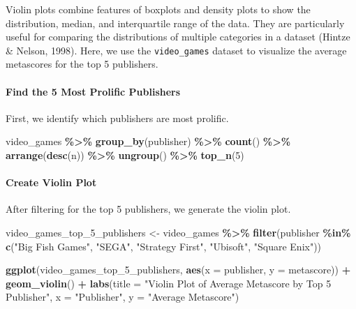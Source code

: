 \documentclass[
]{book}
\newenvironment{Shaded}{\begin{snugshade}}{\end{snugshade}}
\newcommand{\AttributeTok}[1]{\textcolor[rgb]{0.13,0.29,0.53}{#1}}
\newcommand{\DecValTok}[1]{\textcolor[rgb]{0.00,0.00,0.81}{#1}}
\newcommand{\FunctionTok}[1]{\textcolor[rgb]{0.13,0.29,0.53}{\textbf{#1}}}
\newcommand{\NormalTok}[1]{#1}
\newcommand{\OtherTok}[1]{\textcolor[rgb]{0.56,0.35,0.01}{#1}}
\newcommand{\SpecialCharTok}[1]{\textcolor[rgb]{0.81,0.36,0.00}{\textbf{#1}}}
\newcommand{\StringTok}[1]{\textcolor[rgb]{0.31,0.60,0.02}{#1}}
\begin{document}
Violin plots combine features of boxplots and density plots to show the distribution, median, and interquartile range of the data. They are particularly useful for comparing the distributions of multiple categories in a dataset (Hintze \& Nelson, 1998). Here, we use the \texttt{video\_games} dataset to visualize the average metascores for the top 5 publishers.

\hypertarget{find-the-5-most-prolific-publishers}{%
\paragraph*{Find the 5 Most Prolific Publishers}\label{find-the-5-most-prolific-publishers}}

First, we identify which publishers are most prolific.

\begin{Shaded}
\begin{Highlighting}[]
\NormalTok{video\_games }\SpecialCharTok{\%\textgreater{}\%}
  \FunctionTok{group\_by}\NormalTok{(publisher) }\SpecialCharTok{\%\textgreater{}\%}
  \FunctionTok{count}\NormalTok{() }\SpecialCharTok{\%\textgreater{}\%}
  \FunctionTok{arrange}\NormalTok{(}\FunctionTok{desc}\NormalTok{(n)) }\SpecialCharTok{\%\textgreater{}\%}
  \FunctionTok{ungroup}\NormalTok{() }\SpecialCharTok{\%\textgreater{}\%}
  \FunctionTok{top\_n}\NormalTok{(}\DecValTok{5}\NormalTok{)}
\end{Highlighting}
\end{Shaded}

\hypertarget{create-violin-plot}{%
\paragraph*{Create Violin Plot}\label{create-violin-plot}}

After filtering for the top 5 publishers, we generate the violin plot.

\begin{Shaded}
\begin{Highlighting}[]
\NormalTok{video\_games\_top\_5\_publishers }\OtherTok{\textless{}{-}}\NormalTok{ video\_games }\SpecialCharTok{\%\textgreater{}\%}
  \FunctionTok{filter}\NormalTok{(publisher }\SpecialCharTok{\%in\%} \FunctionTok{c}\NormalTok{(}\StringTok{"Big Fish Games"}\NormalTok{, }\StringTok{"SEGA"}\NormalTok{, }\StringTok{"Strategy First"}\NormalTok{, }\StringTok{"Ubisoft"}\NormalTok{, }\StringTok{"Square Enix"}\NormalTok{))}

\FunctionTok{ggplot}\NormalTok{(video\_games\_top\_5\_publishers, }\FunctionTok{aes}\NormalTok{(}\AttributeTok{x =}\NormalTok{ publisher, }\AttributeTok{y =}\NormalTok{ metascore)) }\SpecialCharTok{+}
  \FunctionTok{geom\_violin}\NormalTok{() }\SpecialCharTok{+}
  \FunctionTok{labs}\NormalTok{(}\AttributeTok{title =} \StringTok{"Violin Plot of Average Metascore by Top 5 Publisher"}\NormalTok{,}
       \AttributeTok{x =} \StringTok{"Publisher"}\NormalTok{,}
       \AttributeTok{y =} \StringTok{"Average Metascore"}\NormalTok{)}
\end{Highlighting}
\end{Shaded}
\end{document}
